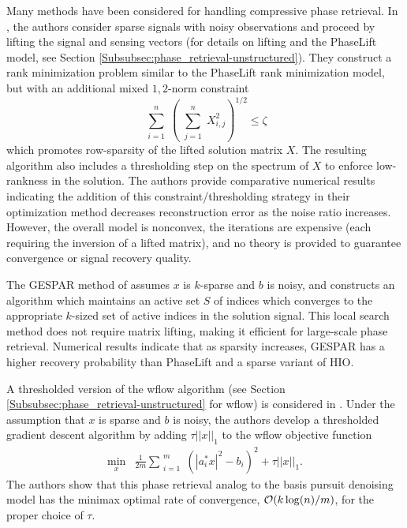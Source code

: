 Many methods have been considered for handling compressive phase retrieval.  In \cite{DBLP:journals/corr/abs-1104-4406}, the authors consider sparse signals with noisy observations and proceed by lifting the signal and sensing vectors (for details on lifting and the PhaseLift model, see Section \ref{Subsubsec:phase_retrieval-unstructured}).  They construct a rank minimization problem similar to the PhaseLift rank minimization model, but with an additional mixed $1,2$-norm constraint
\[
	\sum\limits_{\substack{i = 1}}^{\substack{n}}
	\left( 	\sum\limits_{\substack{j = 1}}^{\substack{n}}  X_{i, j}^2
	\right)^{1/2}
	\leq \zeta
\]
which promotes row-sparsity of the lifted solution matrix $X$.  The resulting algorithm also includes a thresholding step on the spectrum of $X$ to enforce low-rankness in the solution.   The authors provide comparative numerical results indicating the addition of this constraint/thresholding strategy in their optimization method decreases reconstruction error as the noise ratio increases.  However, the overall model is nonconvex, the iterations are expensive (each requiring the inversion of a lifted matrix), and no theory is provided to guarantee convergence or signal recovery quality.


The GESPAR method of \cite{shechtman2014gespar} assumes $x$ is $k$-sparse and $b$ is noisy, and constructs an algorithm which maintains an active set $S$ of indices which converges to the appropriate $k$-sized set of active indices in the solution signal.  This local search method does not require matrix lifting, making it efficient for large-scale phase retrieval.  Numerical results \cite[Section 5]{shechtman2014gespar} indicate that as sparsity increases, GESPAR has a higher recovery probability than PhaseLift and a sparse variant of HIO.

A thresholded version of the wflow algorithm (see Section \ref{Subsubsec:phase_retrieval-unstructured} for wflow) is considered in \cite{cai2016optimal}.  Under the assumption that $x$ is sparse and $b$ is noisy, the authors develop a thresholded gradient descent algorithm by adding $\tau ||x||_1$ to the wflow objective function
\begin{equation}
\begin{array}{ll}
	\min\limits_{\substack{x}}
		&	\frac{1}{2m} \sum\limits_{\substack{i=1}}^{\substack{m}} \left( |a_i^*x|^2 - b_i \right)^2
			+ \tau ||x||_1.
\end{array}
\end{equation}
The authors show that this phase retrieval analog to the basis pursuit denoising model \cite{chen2001atomic} has the minimax optimal rate of convergence, ${\mathcal O} (k \log(n) / m)$, for the proper choice of $\tau$.


